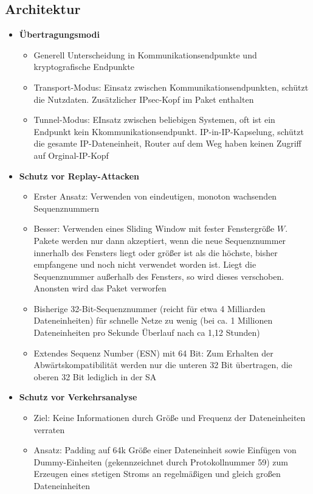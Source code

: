 \subsection{Architektur}
\begin{itemize}
	\item \textbf{Übertragungsmodi}
	\begin{itemize}
		\item Generell Unterscheidung in Kommunikationsendpunkte und kryptografische Endpunkte
		\item Transport-Modus: Einsatz zwischen Kommunikationsendpunkten, schützt die Nutzdaten. Zusätzlicher IPsec-Kopf im Paket enthalten
		\item Tunnel-Modus: EInsatz zwischen beliebigen Systemen, oft ist ein Endpunkt kein Kkommunikationsendpunkt. IP-in-IP-Kapselung, schützt die gesamte IP-Dateneinheit, Router auf dem Weg haben keinen Zugriff auf Orginal-IP-Kopf
	\end{itemize}
	\item \textbf{Schutz vor Replay-Attacken}
	\begin{itemize}
		\item Erster Ansatz: Verwenden von eindeutigen, monoton wachsenden Sequenznummern
		\item Besser: Verwenden eines Sliding Window mit fester Fenstergröße \(W\). Pakete werden nur dann akzeptiert, wenn die neue Sequenznummer innerhalb des Fensters liegt oder größer ist als die höchste, bisher empfangene und noch nicht verwendet worden ist. Liegt die Sequenznummer außerhalb des Fensters, so wird dieses verschoben. Anonsten wird das Paket verworfen
		\item Bisherige 32-Bit-Sequenznummer (reicht für etwa 4 Milliarden Dateneinheiten) für schnelle Netze zu wenig (bei ca. 1 Millionen Dateneinheiten pro Sekunde Überlauf nach ca 1,12 Stunden)
		\item Extendes Sequenz Number (ESN) mit 64 Bit: Zum Erhalten der Abwärtskompatibilität werden nur die unteren 32 Bit übertragen, die oberen 32 Bit lediglich in der SA 
	\end{itemize}
	\item \textbf{Schutz vor Verkehrsanalyse}
	\begin{itemize}
		\item Ziel: Keine Informationen durch Größe und Frequenz der Dateneinheiten verraten
		\item Ansatz: Padding auf 64k Größe einer Dateneinheit sowie Einfügen von Dummy-Einheiten (gekennzeichnet durch Protokollnummer 59) zum Erzeugen eines stetigen Stroms an regelmäßigen und gleich großen Dateneinheiten
	\end{itemize}
\end{itemize}



